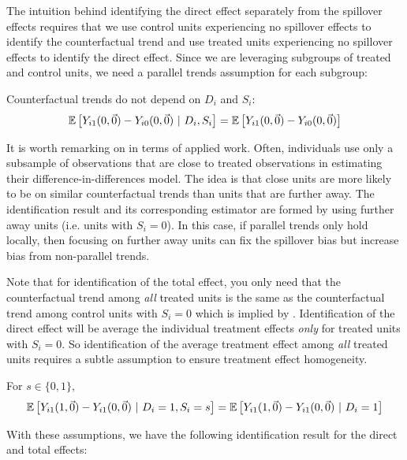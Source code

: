 \documentclass[11pt]{article}
\begin{document}
The intuition behind identifying the direct effect separately from the spillover effects requires that we use control units experiencing no spillover effects to identify the counterfactual trend and use treated units experiencing no spillover effects to identify the direct effect. Since we are leveraging subgroups of treated and control units, we need a parallel trends assumption for each subgroup:

\begin{assumption}\label{assumption:parallel-mod}
    Counterfactual trends do not depend on $D_i$ and $S_i$:
    \[
        \mathbb{E}\left[Y_{i1}(0, \vec{0}) - Y_{i0}(0, \vec{0}) \ \vert \ D_i, S_i\right] = 
        \mathbb{E}\left[Y_{i1}(0, \vec{0}) - Y_{i0}(0, \vec{0})\right]
    \]
\end{assumption}

It is worth remarking on  in terms of applied work. Often, individuals use only a subsample of observations that are close to treated observations in estimating their difference-in-differences model. The idea is that close units are more likely to be on similar counterfactual trends than units that are further away. The identification result and its corresponding estimator are formed by using further away units (i.e. units with $S_i = 0$). In this case, if parallel trends only hold locally, then focusing on further away units can fix the spillover bias but increase bias from non-parallel trends.

Note that for identification of the total effect, you only need that the counterfactual trend among \emph{all} treated units is the same as the counterfactual trend among control units with $S_i = 0$ which is implied by . Identification of the direct effect will be average the individual treatment effects \emph{only} for treated units with $S_i = 0$. So identification of the average treatment effect among \emph{all} treated units requires a subtle assumption to ensure treatment effect homogeneity.

\begin{assumption}\label{assumption:homogenous-direct}
    For $s \in \{0, 1\}$,
    \[
        \mathbb{E}\left[Y_{i1}(1, \vec{0}) - Y_{i1}(0, \vec{0}) \ \vert \ D_i = 1, S_i = s\right] = 
        \mathbb{E}\left[Y_{i1}(1, \vec{0}) - Y_{i1}(0, \vec{0}) \ \vert \ D_i = 1\right]
    \]
\end{assumption}

With these assumptions, we have the following identification result for the direct and total effects:
\end{document}
